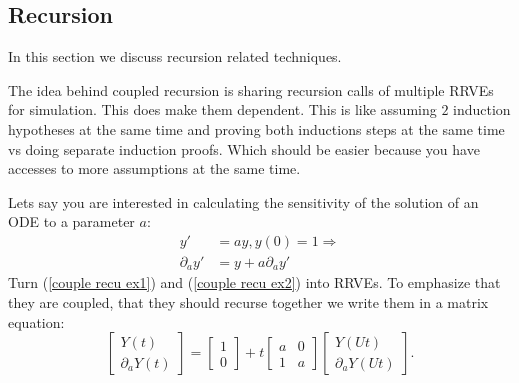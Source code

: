 \documentclass[a4paper,12pt]{article}
\begin{document}
\subsection{Recursion}
In this section we discuss recursion related techniques.

\begin{technique}
    The idea behind coupled recursion is sharing recursion calls of
    multiple RRVEs for simulation. This does make them dependent.
    This is like assuming $2$ induction hypotheses at the same
    time and proving both inductions steps at the same time vs
    doing separate induction proofs. Which should be easier
    because you have accesses to more assumptions at the same time.
\end{technique}

\begin{example}
    Lets say you are interested in calculating the
    sensitivity of the solution of an ODE to a
    parameter $a$:
    \begin{align}
        y'             & =ay,y(0)=1 \Rightarrow \label{couple recu ex1} \\
        \partial_{a}y' & = y + a \partial_{a}y' \label{couple recu ex2}
    \end{align}
    Turn (\ref{couple recu ex1}) and (\ref{couple recu ex2}) into RRVEs.
    To emphasize that they are coupled, that they should
    recurse together we write them in a matrix equation:
    \begin{equation} \label{coupled mat}
        \begin{bmatrix}
            Y(t) \\
            \partial_{a}Y(t)
        \end{bmatrix}=
        \begin{bmatrix}
            1 \\
            0
        \end{bmatrix}+
        t \begin{bmatrix}
            a & 0 \\
            1 & a
        \end{bmatrix}
        \begin{bmatrix}
            Y(Ut) \\
            \partial_{a}Y(Ut)
        \end{bmatrix}.
    \end{equation}

\end{example}
\end{document}
